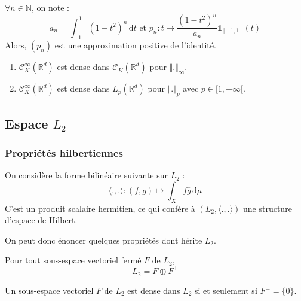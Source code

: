 
  \begin{example}
    $\forall n \in \mathbb{N}$, on note :
    \[ a_n = \int_{-1}^1 (1-t^2)^n \, \mathrm{d}t \text{ et } p_n : t \mapsto \frac{(1-t^2)^n}{a_n} \mathbb{1}_{[-1, 1]}(t) \]
    Alors, $(p_n)$ est une approximation positive de l'identité.
  \end{example}


  \begin{application}
    \begin{enumerate}[label={\bfseries(\roman*)}]
      \item $\mathcal{C}^\infty_K(\mathbb{R}^d)$ est dense dans $\mathcal{C}_K(\mathbb{R}^d)$ pour $\Vert . \Vert_\infty$.
      \item $\mathcal{C}^\infty_K(\mathbb{R}^d)$ est dense dans $L_p(\mathbb{R}^d)$ pour $\Vert . \Vert_p$ avec $p \in [1, +\infty[$.
    \end{enumerate}
  \end{application}

  \subsection{Espace \texorpdfstring{$L_2$}{L₂}}

  \subsubsection{Propriétés hilbertiennes}


  \begin{definition}
    On considère la forme bilinéaire suivante sur $L_2$ :
    \[ \langle ., . \rangle : (f, g) \mapsto \int_X f \overline{g} \, \mathrm{d}\mu \]
    C'est un produit scalaire hermitien, ce qui confère à $(L_2, \langle ., . \rangle)$ une structure d'espace de Hilbert.
  \end{definition}

  On peut donc énoncer quelques propriétés dont hérite $L_2$.


  \begin{theorem}
    Pour tout sous-espace vectoriel fermé $F$ de $L_2$,
    \[ L_2 = F \oplus F^\perp \]
  \end{theorem}

  \begin{corollary}
    Un sous-espace vectoriel $F$ de $L_2$ est dense dans $L_2$ si et seulement si $F^\perp = \{ 0 \}$.
  \end{corollary}

